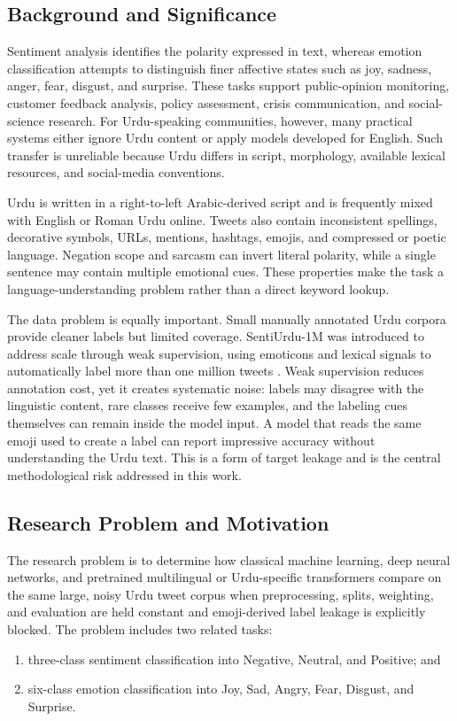 \documentclass[conference]{IEEEtran}
\begin{document}
\subsection{Background and Significance}
Sentiment analysis identifies the polarity expressed in text, whereas emotion classification attempts to distinguish finer affective states such as joy, sadness, anger, fear, disgust, and surprise. These tasks support public-opinion monitoring, customer feedback analysis, policy assessment, crisis communication, and social-science research. For Urdu-speaking communities, however, many practical systems either ignore Urdu content or apply models developed for English. Such transfer is unreliable because Urdu differs in script, morphology, available lexical resources, and social-media conventions.

Urdu is written in a right-to-left Arabic-derived script and is frequently mixed with English or Roman Urdu online. Tweets also contain inconsistent spellings, decorative symbols, URLs, mentions, hashtags, emojis, and compressed or poetic language. Negation scope and sarcasm can invert literal polarity, while a single sentence may contain multiple emotional cues. These properties make the task a language-understanding problem rather than a direct keyword lookup.

The data problem is equally important. Small manually annotated Urdu corpora provide cleaner labels but limited coverage. SentiUrdu-1M was introduced to address scale through weak supervision, using emoticons and lexical signals to automatically label more than one million tweets \cite{ghafoor2023sentiurdu}. Weak supervision reduces annotation cost, yet it creates systematic noise: labels may disagree with the linguistic content, rare classes receive few examples, and the labeling cues themselves can remain inside the model input. A model that reads the same emoji used to create a label can report impressive accuracy without understanding the Urdu text. This is a form of target leakage and is the central methodological risk addressed in this work.

\subsection{Research Problem and Motivation}
The research problem is to determine how classical machine learning, deep neural networks, and pretrained multilingual or Urdu-specific transformers compare on the same large, noisy Urdu tweet corpus when preprocessing, splits, weighting, and evaluation are held constant and emoji-derived label leakage is explicitly blocked. The problem includes two related tasks:
\begin{enumerate}[leftmargin=*,nosep]
    \item three-class sentiment classification into Negative, Neutral, and Positive; and
    \item six-class emotion classification into Joy, Sad, Angry, Fear, Disgust, and Surprise.
\end{enumerate}
\end{document}
